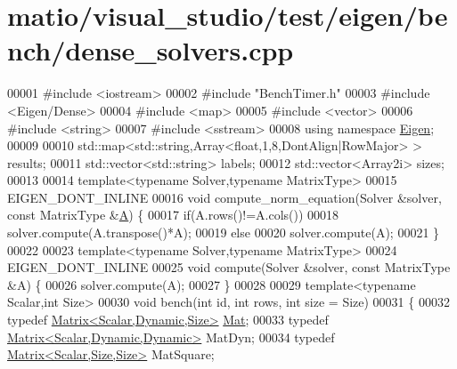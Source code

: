 \hypertarget{matio_2visual__studio_2test_2eigen_2bench_2dense__solvers_8cpp_source}{}\section{matio/visual\+\_\+studio/test/eigen/bench/dense\+\_\+solvers.cpp}
\label{matio_2visual__studio_2test_2eigen_2bench_2dense__solvers_8cpp_source}

\begin{DoxyCode}
00001 \textcolor{preprocessor}{#include <iostream>}
00002 \textcolor{preprocessor}{#include "BenchTimer.h"}
00003 \textcolor{preprocessor}{#include <Eigen/Dense>}
00004 \textcolor{preprocessor}{#include <map>}
00005 \textcolor{preprocessor}{#include <vector>}
00006 \textcolor{preprocessor}{#include <string>}
00007 \textcolor{preprocessor}{#include <sstream>}
00008 \textcolor{keyword}{using namespace }\hyperlink{namespace_eigen}{Eigen};
00009 
00010 std::map<std::string,Array<float,1,8,DontAlign|RowMajor> > results;
00011 std::vector<std::string> labels;
00012 std::vector<Array2i> sizes;
00013 
00014 \textcolor{keyword}{template}<\textcolor{keyword}{typename} Solver,\textcolor{keyword}{typename} MatrixType>
00015 EIGEN\_DONT\_INLINE
00016 \textcolor{keywordtype}{void} compute\_norm\_equation(Solver &solver, \textcolor{keyword}{const} MatrixType &\hyperlink{group___core___module_class_eigen_1_1_matrix}{A}) \{
00017   \textcolor{keywordflow}{if}(A.rows()!=A.cols())
00018     solver.compute(A.transpose()*A);
00019   \textcolor{keywordflow}{else}
00020     solver.compute(A);
00021 \}
00022 
00023 \textcolor{keyword}{template}<\textcolor{keyword}{typename} Solver,\textcolor{keyword}{typename} MatrixType>
00024 EIGEN\_DONT\_INLINE
00025 \textcolor{keywordtype}{void} compute(Solver &solver, \textcolor{keyword}{const} MatrixType &A) \{
00026   solver.compute(A);
00027 \}
00028 
00029 \textcolor{keyword}{template}<\textcolor{keyword}{typename} Scalar,\textcolor{keywordtype}{int} Size>
00030 \textcolor{keywordtype}{void} bench(\textcolor{keywordtype}{int} \textcolor{keywordtype}{id}, \textcolor{keywordtype}{int} rows, \textcolor{keywordtype}{int} size = Size)
00031 \{
00032   \textcolor{keyword}{typedef} \hyperlink{group___core___module_class_eigen_1_1_matrix}{Matrix<Scalar,Dynamic,Size>} \hyperlink{group___core___module}{Mat};
00033   \textcolor{keyword}{typedef} \hyperlink{group___core___module}{Matrix<Scalar,Dynamic,Dynamic>} MatDyn;
00034   \textcolor{keyword}{typedef} \hyperlink{group___core___module_class_eigen_1_1_matrix}{Matrix<Scalar,Size,Size>} MatSquare;

\end{DoxyCode}
